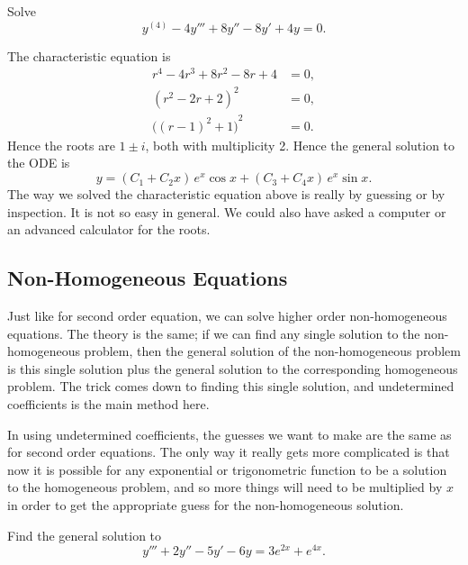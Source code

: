 \begin{example}
Solve
\begin{equation*}
y^{(4)} - 4 y''' + 8 y'' - 8 y' + 4y = 0 .
\end{equation*}
\end{example}

\begin{exampleSol}
The characteristic equation is
\begin{align*}
r^4 - 4 r^3 + 8 r^2 - 8 r + 4 & = 0 , \\
{(r^2-2r+2)}^2 & = 0 , \\
{\bigl({(r-1)}^2+1\bigr)}^2 & = 0 .
\end{align*}
Hence the roots are $1 \pm i$, both with multiplicity 2.  Hence the general
solution to the ODE is
\begin{equation*}
y = 
( C_1 + C_2 x ) \, e^{x} \cos x
+
( C_3 + C_4 x ) \, e^{x} \sin x .
\end{equation*}
The way we solved the characteristic equation above is really by guessing or
by inspection.  It is not so easy in general.  We could also have asked
a computer or an advanced calculator for the roots.
\end{exampleSol}


\subsection{Non-Homogeneous Equations}

Just like for second order equation, we can solve higher order non-homogeneous equations. The theory is the same; if we can find any single solution to the non-homogeneous problem, then the general solution of the non-homogeneous problem is this single solution plus the general solution to the corresponding homogeneous problem. The trick comes down to finding this single solution, and undetermined coefficients is the main method here.

In using undetermined coefficients, the guesses we want to make are the same as for second order equations. The only way it really gets more complicated is that now it is possible for any exponential or trigonometric function to be a solution to the homogeneous problem, and so more things will need to be multiplied by $x$ in order to get the appropriate guess for the non-homogeneous solution.

\begin{example}
Find the general solution to 
\[ y''' + 2y'' - 5y' - 6y = 3e^{2x} + e^{4x}.\]
\end{example}


